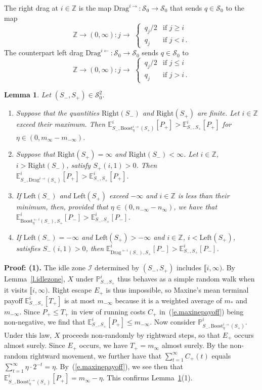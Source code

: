 \documentclass[letterpaper,11pt,oneside,reqno]{amsbook}
\newcommand{\PP}{\ensuremath{\mathbb{P}}}
\newcommand{\Z}{\ensuremath{\mathbb{Z}}}
\newcommand{\E}[0]{\mathbb{E}}
\numberwithin{figure}{chapter}
\newtheorem{lemma}[theorem]{Lemma}
\theoremstyle{definition}
\theoremstyle{definition}
\theoremstyle{definition}
\theoremstyle{definition}
\theoremstyle{definition}
\newcommand{\mc}{\mathcal}
\newcommand{\tis}{\mc{S}_0}
\newcommand\pgameplay[3]{\PP^{#3}_{#1,#2}}
\newcommand\egameplay[3]{\E^{#3}_{#1,#2}}
\newcommand{\boost}{\textrm{Boost}}
\newcommand{\drag}{\textrm{Drag}}
\newcommand{\lef}{\textrm{Left}}
\newcommand{\righ}{\textrm{Right}}
\begin{document}
The right drag  at $i \in \Z$  is the map $\drag^{i\rightarrow}:\tis \to \tis$ that sends $q  \in \tis$ to the map
$$
\Z \to (0,\infty ): j \to \, \,  \begin{cases}
  \, q_j/2  &  \text{if $j \geq i$} \\
 \, q_j  &  \text{if $j < i$} \, .
\end{cases}
$$
The counterpart left drag  $\drag^{i\leftarrow}:\tis \to \tis$ sends $q  \in \tis$ to 
$$
\Z \to (0,\infty ): j \to \, \,  \begin{cases}
  \, q_j/2  &  \text{if $j \leq i$} \\
 \, q_j  &  \text{if $j > i$} \, .
\end{cases}
$$
\begin{lemma}\label{l.boostdrag}
Let $(S_-,S_+) \in \tis^2$. 
\begin{enumerate}
\item Suppose that the quantities $\righ(S_-)$ and $\righ(S_+)$ are finite. Let $i \in \Z$ exceed their maximum. Then $\egameplay{S_-}{\boost_\eta^{i\rightarrow}(S_+)}{i}[P_+] > \egameplay{S_-}{S_+}{i}[P_+]$ for $\eta \in (0,m_\infty - m_{-\infty})$. 
\item Suppose that $\righ(S_+) = \infty$ and $\righ(S_-) < \infty$. Let $i \in \Z$, $i > \righ(S_-)$, satisfy $S_+(i,1) > 0$. Then  $\egameplay{S_-}{\drag^{i\rightarrow}(S_+)}{i}[P_+] > \egameplay{S_-}{S_+}{i}[P_+]$.
\item If $\lef(S_-)$ and $\lef(S_+)$ exceed $-\infty$ and $i \in \Z$ is less than their minimum, then, provided that $\eta \in (0,n_{-\infty} - n_\infty)$, we have that $\egameplay{\boost_\eta^{\leftarrow i}(S_-)}{S_+}{i}[P_-] > \egameplay{S_-}{S_+}{i}[P_-]$.
\item If $\lef(S_-) = -\infty$ and $\lef(S_+) > - \infty$ and $i \in \Z$, $i < \lef(S_+)$, satisfies $S_-(i,1) > 0$, then  $\egameplay{\drag^{\leftarrow i}(S_-)}{S_+}{i}[P_-] > \egameplay{S_-}{S_+}{i}[P_-]$.
\end{enumerate}
\end{lemma}
{\bf Proof: (1).} The idle zone $\mc{I}$ determined by $(S_-,S_+)$ includes $\llbracket i,\infty)$. By Lemma~\ref{l.idlezone}, $X$ under $\pgameplay{S_-}{S_+}{i}$ thus behaves as a simple random walk when it visits $\llbracket i,\infty)$. Right escape $E_+$ is thus impossible, so Maxine's mean terminal payoff $\egameplay{S_-}{S_+}{i} [T_+]$ is at most $m_{-\infty}$ because it 
is a weighted average of $m_*$ and $m_{-\infty}$. Since $P_+ \leq T_+$ in view of running costs $C_+$ in~(\ref{e.maxinepayoff}) being non-negative, we find that $\egameplay{S_-}{S_+}{i}[P_+] \leq m_{-\infty}$.
Now consider $\pgameplay{S_-}{\boost_\eta^{i\rightarrow}(S_+)}{i}$. Under this law, $X$ proceeds non-randomly by rightward steps, so that $E_+$ occurs almost surely. Since $E_+$ occurs, we have $T_+ = m_\infty$ almost surely. By the non-random rightward movement, we further have that $\sum_{t=1}^\infty C_+(t)$ equals $\sum_{t=1}^\infty \eta \cdot 2^{-t} = \eta$. By~(\ref{e.maxinepayoff}),
we see then that    $\egameplay{S_-}{\boost_\eta^{i\rightarrow}(S_+)}{i}[P_+] = m_\infty - \eta$. This confirms Lemma~\ref{l.boostdrag}(1).
\end{document}
